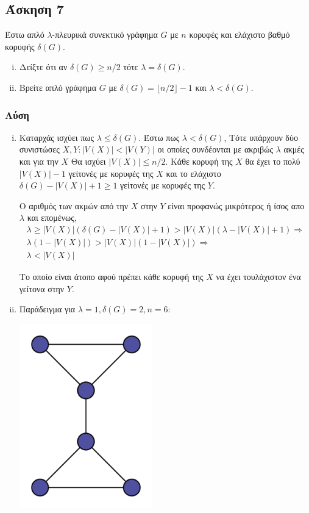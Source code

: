 \subsection*{Άσκηση 7}

Έστω απλό $\lambda$-πλευρικά συνεκτικό γράφημα $G$ με $n$ κορυφές και ελάχιστο βαθμό κορυφής $\delta(G)$.  
\begin{enumerate}[(i)]
\item
Δείξτε ότι αν $\delta(G) \ge n/2$ τότε $\lambda = \delta(G)$.
\item
Βρείτε απλό γράφημα $G$ με $\delta(G)=\lfloor n/2\rfloor - 1$ και $\lambda < \delta(G)$.
\end{enumerate}

\subsubsection*{Λύση}

\begin{enumerate}[(i)]
\item
Καταρχάς ισχύει πως $\lambda \le \delta(G)$. 
Έστω πως $\lambda < \delta(G)$,
Τότε υπάρχουν δύο συνιστώσες $X,Y : |V(X)| < |V(Y)|$ οι οποίες συνδέονται με ακριβώς $\lambda$ ακμές και 
για την $X$ Θα ισχύει $|V(X)| \le n/2$. Κάθε κορυφή της $X$ θα έχει το πολύ $|V(X)|-1$ γείτονές
με κορυφές της $X$ και το ελάχιστο $\delta(G)-|V(X)|+1 \ge 1 $ γείτονές με κορυφές της $Y$.

Ο αριθμός των ακμών από την $X$ στην $Y$ είναι προφανώς μικρότερος ή ίσος απο $\lambda$ και επομένως,
\begin{gather*}
    \lambda \ge |V(X)|(\delta(G)- |V(X)| + 1) > |V(X)|(\lambda - |V(X)| +1) \Rightarrow \\
    \lambda(1-|V(X)|) > |V(X)|(1-|V(X)|) \Rightarrow \\
    \lambda < |V(X)|
\end{gather*}

Το οποίο είναι άτοπο αφού πρέπει κάθε κορυφή της $X$ να έχει τουλάχιστον ένα γείτονα στην $Y$.

\item
Παράδειγμα για $\lambda=1, \delta(G)=2, n=6$:

        \begin{center}\includegraphics[height=8cm,width=.3\textwidth]{exercise7/diagrams/d1.png}\end{center}

\end{enumerate}
